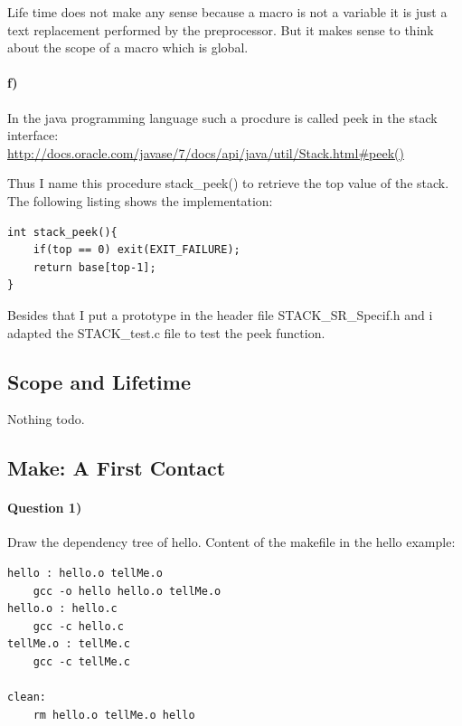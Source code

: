 \documentclass[12pt]{article}
\begin{document}
Life time does not make any sense because a macro is not a variable it is just a text replacement performed by the preprocessor. But it makes sense to think about the scope of a macro which is global.

\paragraph{f)}

In the java programming language such a procdure is called peek in the stack interface:\\ 
\url{http://docs.oracle.com/javase/7/docs/api/java/util/Stack.html#peek()}

Thus I name this procedure stack\_peek() to retrieve the top value of the stack.
The following listing shows the implementation:
\begin{lstlisting}
int stack_peek(){
	if(top == 0) exit(EXIT_FAILURE);
	return base[top-1];
}
\end{lstlisting}

Besides that I put a prototype in the header file STACK\_SR\_Specif.h and i adapted the STACK\_test.c file to test the peek function.
\subsection*{Scope and Lifetime}
Nothing todo.

\subsection*{Make: A First Contact}

\paragraph{Question 1)} Draw the dependency tree of hello.
Content of the makefile in the hello example:
\begin{lstlisting}
hello : hello.o tellMe.o
	gcc -o hello hello.o tellMe.o
hello.o : hello.c
	gcc -c hello.c
tellMe.o : tellMe.c
	gcc -c tellMe.c

clean:
	rm hello.o tellMe.o hello
\end{lstlisting}
\end{document}
